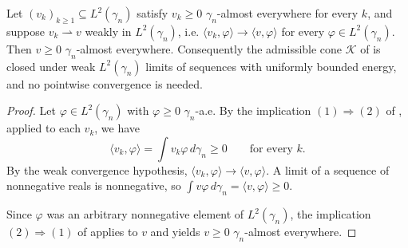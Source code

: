 \begin{lemma}
Let $(v_k)_{k \geq 1} \subseteq L^2(\gamma_n)$ satisfy $v_k \geq 0$
$\gamma_n$-almost everywhere for every $k$, and suppose $v_k \rightharpoonup v$
weakly in $L^2(\gamma_n)$, i.e.
$\langle v_k, \varphi\rangle \to \langle v, \varphi\rangle$ for every
$\varphi \in L^2(\gamma_n)$.  Then $v \geq 0$ $\gamma_n$-almost everywhere.
Consequently the admissible cone $\mathcal{K}$ of  is
closed under weak $L^2(\gamma_n)$ limits of sequences with uniformly bounded
energy, and no pointwise convergence is needed.
\end{lemma}
\begin{proof}
Let $\varphi \in L^2(\gamma_n)$ with $\varphi \geq 0$ $\gamma_n$-a.e.  By the
implication $(1) \Rightarrow (2)$ of , applied
to each $v_k$, we have
\[
  \langle v_k, \varphi\rangle = \int v_k \varphi \, d\gamma_n \geq 0
  \qquad\text{for every } k .
\]
By the weak convergence hypothesis, $\langle v_k, \varphi\rangle \to \langle v, \varphi\rangle$.
A limit of a sequence of nonnegative reals is nonnegative, so
$\int v \varphi \, d\gamma_n = \langle v, \varphi\rangle \geq 0$.

Since $\varphi$ was an arbitrary nonnegative element of $L^2(\gamma_n)$, the
implication $(2) \Rightarrow (1)$ of  applies
to $v$ and yields $v \geq 0$ $\gamma_n$-almost everywhere.
\end{proof}
